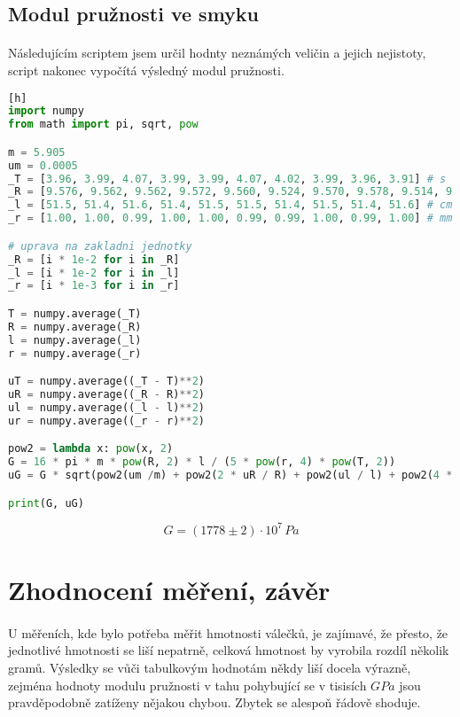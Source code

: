\documentclass[a4paper,11pt]{article}
\begin{document}
    \subsection{Modul pružnosti ve smyku}

        \paragraph{} Následujícím scriptem jsem určil hodnty neznámých veličin a
        jejich nejistoty, script nakonec vypočítá výsledný modul pružnosti.

\begin{lstlisting}[language=Python][h]
import numpy
from math import pi, sqrt, pow

m = 5.905
um = 0.0005
_T = [3.96, 3.99, 4.07, 3.99, 3.99, 4.07, 4.02, 3.99, 3.96, 3.91] # s
_R = [9.576, 9.562, 9.562, 9.572, 9.560, 9.524, 9.570, 9.578, 9.514, 9.568] # cm
_l = [51.5, 51.4, 51.6, 51.4, 51.5, 51.5, 51.4, 51.5, 51.4, 51.6] # cm
_r = [1.00, 1.00, 0.99, 1.00, 1.00, 0.99, 0.99, 1.00, 0.99, 1.00] # mm

# uprava na zakladni jednotky
_R = [i * 1e-2 for i in _R]
_l = [i * 1e-2 for i in _l]
_r = [i * 1e-3 for i in _r]

T = numpy.average(_T)
R = numpy.average(_R)
l = numpy.average(_l)
r = numpy.average(_r)

uT = numpy.average((_T - T)**2)
uR = numpy.average((_R - R)**2)
ul = numpy.average((_l - l)**2)
ur = numpy.average((_r - r)**2)

pow2 = lambda x: pow(x, 2)
G = 16 * pi * m * pow(R, 2) * l / (5 * pow(r, 4) * pow(T, 2))
uG = G * sqrt(pow2(um /m) + pow2(2 * uR / R) + pow2(ul / l) + pow2(4 * ur / r) + pow2(2 * uT / T))

print(G, uG) \end{lstlisting}

    $$ G = \left(1778 \pm 2\right) \cdot 10^{7} \, Pa$$

\section{Zhodnocení měření, závěr}

    \paragraph{} U měřeních, kde bylo potřeba měřit hmotnosti válečků, je zajímavé, že
    přesto, že jednotlivé hmotnosti se liší nepatrně, celková hmotnost by vyrobila rozdíl
    několik gramů. Výsledky se vůči tabulkovým hodnotám někdy liší docela výrazně, zejména hodnoty
    modulu pružnosti v tahu pohybující se v tisisích $GPa$ jsou pravděpodobně zatíženy nějakou
    chybou. Zbytek se alespoň řádově shoduje.
\end{document}
